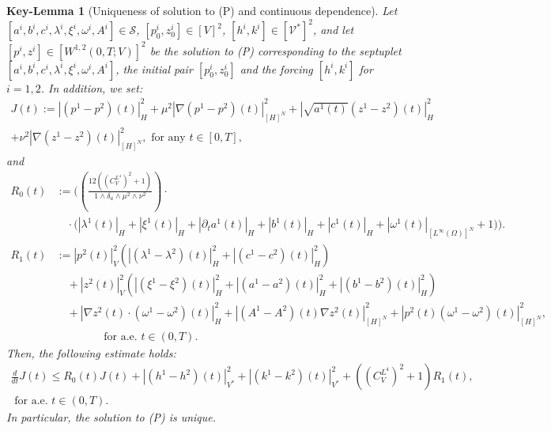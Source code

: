 \documentclass{sinst}
\numberwithin{equation}{section}
\theoremstyle{plain}
\newtheorem{keylem}{Key-Lemma}
\theoremstyle{definition}
\def\sS{\mathscr{S}}
\def\sV{\mathscr{V}}
\begin{document}
\begin{keylem}[Uniqueness of solution to (P) and continuous dependence] \label{lem:P_uni}
  Let \linebreak $[a^i, b^i, c^i, \lambda^i, \xi^i, \omega^i, A^i] \in \sS$, $[p_0^i, z_0^i] \in [V]^2$, $[h^i, k^i] \in [\sV^*]^2$, and let $[p^i, z^i] \in [W^{1,2}(0,T;V)]^2$ be the solution to (P) corresponding to the septuplet $[a^i, b^i, c^i, \lambda^i, \xi^i, \omega^i, A^i]$, the initial pair $[p_0^i, z_0^i]$ and the forcing $[h^i,k^i]$ for $i=1,2$. In addition, we set:
  \begin{gather}
    J(t) := |(p^1 - p^2)(t)|_H^2 + \mu^2 |\nabla (p^1 - p^2)(t)|_{[H]^N}^2 + |\sqrt{a^1(t)}(z^1 - z^2)(t)|_H^2 
    \\
    + \nu^2 |\nabla(z^1 - z^2)(t)|_{[H]^N}^2, \mbox{ for any } t \in [0,T], \label{P_uni00}
  \end{gather}
  and
  \begin{align}
    R_0(t) &:= \biggl( \left( \frac{12((C_V^{L^4})^2 + 1)}{1 \wedge \delta_a \wedge \mu^2 \wedge \nu^2} \right) \cdot 
    \\
    &\quad \cdot \bigl(|\lambda^1(t)|_H + |\xi^1(t)|_H + |\partial_t a^1(t)|_H + |b^1(t)|_H + |c^1(t)|_H + |\omega^1(t)|_{[L^\infty(\Omega)]^N} + 1 \bigr) \biggr).
    \\
    R_1(t) &:= |p^2(t)|_V^2 (|(\lambda^1 - \lambda^2)(t)|_H^2 + |(c^1 - c^2)(t)|_H^2) \label{P_uni01}
    \\
    &\quad + |z^2(t)|_V^2 (|(\xi^1 - \xi^2)(t)|_H^2 + |(a^1 - a^2)(t)|_H^2 + |(b^1 - b^2)(t)|_H^2)
    \\
    &\quad + |\nabla z^2(t) \cdot (\omega^1 - \omega^2)(t)|_H^2 + |(A^1 - A^2)(t) \nabla z^2(t)|_{[H]^N}^2 + |p^2(t) (\omega^1 - \omega^2)(t)|_{[H]^N}^2,
    \\
    &\qquad\qquad \mbox{ for a.e. } t \in (0,T).
  \end{align} 
  Then, the following estimate holds:
  \begin{gather}
    \frac{d}{dt} J(t) \leq R_0(t) J(t) + |(h^1 - h^2)(t)|_{V^*}^2 + |(k^1 - k^2)(t)|_{V^*}^2 + ((C_V^{L^4})^2 + 1) R_1(t),
    \\
    \mbox{ for a.e. } t \in (0,T). \label{P_uni99}
  \end{gather}
  In particular, the solution to (P) is unique.
\end{keylem}
\end{document}
